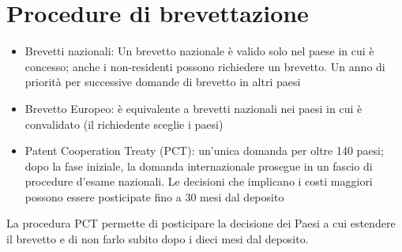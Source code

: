 \section{Procedure di brevettazione}

\begin{itemize}
    \item Brevetti nazionali: Un brevetto nazionale è valido solo nel paese in cui è concesso; anche i non-residenti possono richiedere un brevetto. Un anno di priorità per successive domande di brevetto in altri paesi
    \item Brevetto Europeo: è equivalente a brevetti nazionali nei paesi in cui è convalidato (il richiedente sceglie i paesi)
    \item Patent Cooperation Treaty (PCT): un’unica domanda per oltre 140 paesi; dopo la fase iniziale, la domanda internazionale prosegue in un fascio di procedure d’esame nazionali. Le decisioni che implicano i costi maggiori possono essere posticipate fino a 30 mesi dal deposito
\end{itemize}

La procedura PCT permette di posticipare la decisione dei Paesi a cui estendere il brevetto e di non farlo subito dopo i dieci mesi dal deposito.